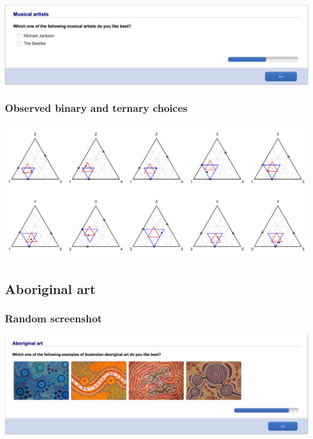 \documentclass[11pt,letter]{article}
\begin{document}
\includegraphics[width=15cm]{Population_study_design/screenshot_Musical_Artists.png}

\subsubsection*{Observed binary and ternary choices}

\includegraphics[width=15cm]{./Population_study_data/Simplexes/Musical_artists.pdf}

\pagebreak

\subsection*{Aboriginal art}



\subsubsection*{Random screenshot}

\includegraphics[width=15cm]{Population_study_design/screenshot_Aboriginal_Art.png}
\end{document}
